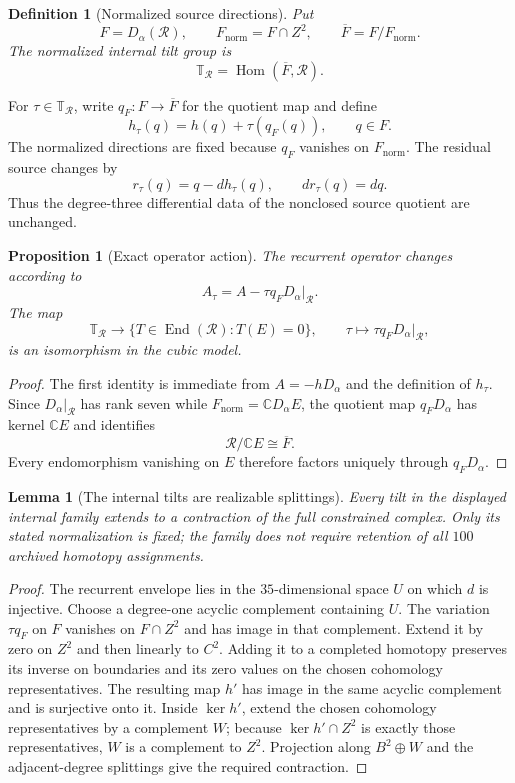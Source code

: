 \documentclass[11pt]{amsart}
\newtheorem{proposition}[theorem]{Proposition}
\newtheorem{lemma}[theorem]{Lemma}
\newtheorem{definition}[theorem]{Definition}
\newcommand{\C}{\mathbb C}
\newcommand{\End}{\operatorname{End}}
\newcommand{\Hom}{\operatorname{Hom}}
\begin{document}
\begin{definition}[Normalized source directions]
Put
\[
F=D_\alpha(\mathcal R),
\qquad
F_{\mathrm{norm}}=F\cap Z^2,
\qquad
\overline F=F/F_{\mathrm{norm}}.
\]
The normalized internal tilt group is
\[
\mathbb T_{\mathcal R}=\Hom(\overline F,\mathcal R).
\]
\end{definition}

For \(\tau\in\mathbb T_{\mathcal R}\), write \(q_F:F\to\overline F\) for the quotient map and define
\[
h_\tau(q)=h(q)+\tau(q_F(q)),
\qquad q\in F.
\]
The normalized directions are fixed because \(q_F\) vanishes on \(F_{\mathrm{norm}}\).  The residual source changes by
\[
r_\tau(q)=q-dh_\tau(q),
\qquad
dr_\tau(q)=dq.
\]
Thus the degree-three differential data of the nonclosed source quotient are unchanged.

\begin{proposition}[Exact operator action]
The recurrent operator changes according to
\[
A_\tau=A-\tau q_FD_\alpha|_{\mathcal R}.
\]
The map
\[
\mathbb T_{\mathcal R}
\longrightarrow
\{T\in\End(\mathcal R):T(E)=0\},
\qquad
\tau\longmapsto \tau q_FD_\alpha|_{\mathcal R},
\]
is an isomorphism in the cubic model.
\end{proposition}

\begin{proof}
The first identity is immediate from \(A=-hD_\alpha\) and the definition of \(h_\tau\).  Since \(D_\alpha|_{\mathcal R}\) has rank seven while \(F_{\mathrm{norm}}=\C D_\alpha E\), the quotient map \(q_FD_\alpha\) has kernel \(\C E\) and identifies
\[
\mathcal R/\C E\cong\overline F.
\]
Every endomorphism vanishing on \(E\) therefore factors uniquely through \(q_FD_\alpha\).
\end{proof}

\begin{lemma}[The internal tilts are realizable splittings]
Every tilt in the displayed internal family extends to a contraction of the
full constrained complex. Only its stated normalization is fixed; the family
does not require retention of all $100$ archived homotopy assignments.
\end{lemma}
\begin{proof}
The recurrent envelope lies in the $35$-dimensional space $U$ on which $d$
is injective. Choose a degree-one acyclic complement containing $U$.
The variation $\tau q_F$ on $F$ vanishes on $F\cap Z^2$ and has image in
that complement. Extend it by zero on $Z^2$ and then linearly to $C^2$.
Adding it to a completed homotopy preserves its inverse on boundaries and
its zero values on the chosen cohomology representatives.
The resulting map $h'$ has image in the same acyclic complement and is
surjective onto it. Inside $\ker h'$, extend the chosen cohomology
representatives by a complement $W$; because
$\ker h'\cap Z^2$ is exactly those representatives, $W$ is a complement to
$Z^2$. Projection along $B^2\oplus W$ and the adjacent-degree splittings
give the required contraction.
\end{proof}
\end{document}
